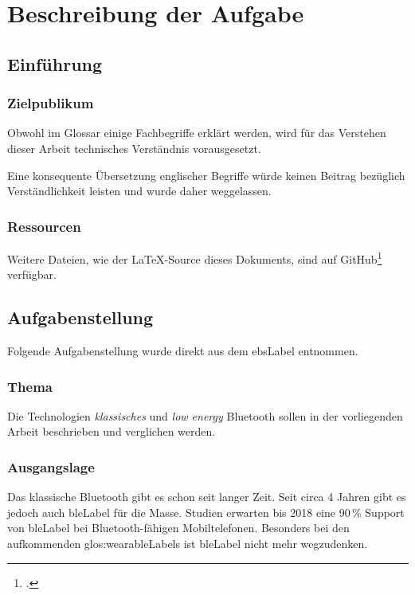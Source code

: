 \chapter{Beschreibung der Aufgabe}

\section{Einführung}
\subsection{Zielpublikum}
Obwohl im Glossar einige Fachbegriffe erklärt werden, wird für das Verstehen dieser Arbeit technisches Verständnis vorausgesetzt.

Eine konsequente Übersetzung englischer Begriffe würde keinen Beitrag bezüglich Verständlichkeit leisten und wurde daher weggelassen.

\subsection{Ressourcen}
Weitere Dateien, wie der \LaTeX-Source dieses Dokuments, sind auf GitHub\footcite{GitHub_ble-seminar_2015-04-17} verfügbar.

\section{Aufgabenstellung}
Folgende Aufgabenstellung wurde direkt aus dem \gls{ebsLabel} entnommen.

\subsection{Thema}
Die Technologien \textit{klassisches} und \textit{low energy} Bluetooth sollen in der vorliegenden Arbeit beschrieben und verglichen werden.

\subsection{Ausgangslage}
Das klassische Bluetooth gibt es schon seit langer Zeit.
Seit circa 4 Jahren gibt es jedoch auch \gls{bleLabel} für die Masse. Studien erwarten bis 2018 eine 90\,\% Support von \gls{bleLabel} bei Bluetooth-fähigen Mobiltelefonen.
Besonders bei den aufkommenden \glspl{glos:wearableLabel} ist \gls{bleLabel} nicht mehr wegzudenken.

